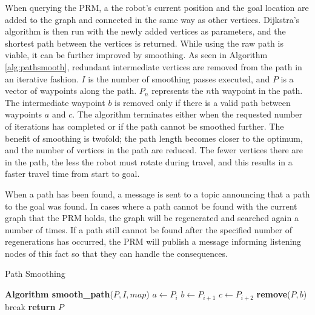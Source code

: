 \documentclass[conference]{IEEEtran}
\begin{document}
When querying the PRM, a the robot's current position and the goal location are added to the graph and connected in the same way as other vertices. Dijkstra's algorithm is then run with the newly added vertices as parameters, and the shortest path between the vertices is returned. While using the raw path is viable, it can be further improved by smoothing. As seen in Algorithm \ref{alg:pathsmooth}, redundant intermediate vertices are removed from the path in an iterative fashion. $I$ is the number of smoothing passes executed, and $P$ is a vector of waypoints along the path. $P_n$ represents the $n$th waypoint in the path. The intermediate waypoint $b$ is removed only if there is a valid path between waypoints $a$ and $c$. The algorithm terminates either when the requested number of iterations has completed or if the path cannot be smoothed further. The benefit of smoothing is twofold; the path length becomes closer to the optimum, and the number of vertices in the path are reduced. The fewer vertices there are in the path, the less the robot must rotate during travel, and this results in a faster travel time from start to goal.

When a path has been found, a message is sent to a topic announcing that a path to the goal was found. In cases where a path cannot be found with the current graph that the PRM holds, the graph will be regenerated and searched again a number of times. If a path still cannot be found after the specified number of regenerations has occurred, the PRM will publish a message informing listening nodes of this fact so that they can handle the consequences.

\begin{algorithm}
  \caption{Path Smoothing}
  \label{alg:pathsmooth}
  \begin{algorithmic}[1]
    \State \textbf{Algorithm smooth\_path}\textnormal{($P, I, map$)}
    \State $a \gets P_i$
    \State $b \gets P_{i+1}$
    \State $c \gets P_{i+2}$
    \State \textbf{remove}($P,b$)
    \EndIf
    \EndFor
    \State break
    \EndIf
    \EndFor
    \State \textbf{return}\textnormal{ $P$}
  \end{algorithmic}
\end{algorithm}
\end{document}
